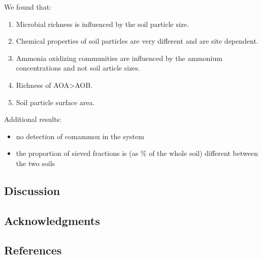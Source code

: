 \documentclass[
]{article}
\providecommand{\tightlist}{%
  \setlength{\itemsep}{0pt}\setlength{\parskip}{0pt}}
\begin{document}
We found that:

\begin{enumerate}
\def\labelenumi{\arabic{enumi}.}
\tightlist
\item
  Microbial richness is influenced by the soil particle size.\\
\item
  Chemical properties of soil particles are very different and are site
  dependent.
\item
  Ammonia oxidizing communities are influenced by the ammonium
  concentrations and not soil article sizes.
\item
  Richness of AOA\textgreater AOB.
\item
  Soil particle surface area.
\end{enumerate}

Additional results:

\begin{itemize}
\tightlist
\item
  no detection of comammox in the system
\item
  the proportion of sieved fractions is (as \% of the whole soil)
  different between the two soils
\end{itemize}

\newpage

\hypertarget{discussion}{%
\subsection{Discussion}\label{discussion}}

\newpage

\hypertarget{acknowledgments}{%
\subsection{Acknowledgments}\label{acknowledgments}}

\hypertarget{references}{%
\subsection{References}\label{references}}

\newpage
\end{document}
